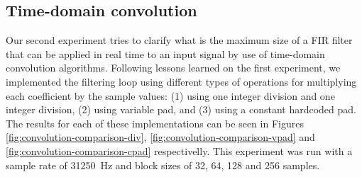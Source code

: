 
%


%                                                       
\subsection{Time-domain convolution}

Our second experiment tries to clarify what is the maximum size of a FIR
filter that can be applied in real time to an input signal by use of
time-domain convolution algorithms. Following lessons learned on the first
experiment, we implemented the filtering loop using different types of operations for multiplying each coefficient by the sample values: (1) using one integer division and one integer division, (2) using variable pad, and (3) using a constant hardcoded pad. The results for each of these implementations can be seen in Figures \ref{fig:convolution-comparison-div}, \ref{fig:convolution-comparison-vpad} and \ref{fig:convolution-comparison-cpad} respectivelly. This experiment was run with a sample rate of 31250~Hz and block sizes of 32, 64, 128 and 256 samples.



